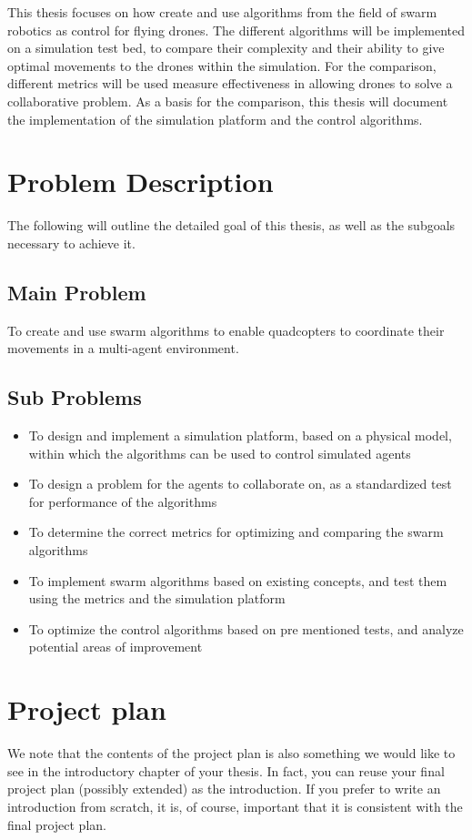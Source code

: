 This thesis focuses on how create and use algorithms from the field of swarm robotics as control for flying drones.
The different algorithms will be implemented on a simulation test bed, to compare their complexity and their ability to give optimal movements to the drones within the simulation. 
For the comparison, different metrics will be used measure effectiveness in allowing drones to solve a collaborative problem.
As a basis for the comparison, this thesis will document the implementation of the simulation platform and the control algorithms.

\section{Problem Description}
The following will outline the detailed goal of this thesis, as well as the subgoals necessary to achieve it. 

\subsection{Main Problem}
To create and use swarm algorithms to enable quadcopters to coordinate their movements in a multi-agent environment. 

\subsection{Sub Problems}
\label{intro:sub_problems}
\begin{itemize}
	\item{To design and implement a simulation platform, based on a physical model, within which the algorithms can be used to control simulated agents}
	\item{To design a problem for the agents to collaborate on, as a standardized test for performance of the algorithms}
	\item{To determine the correct metrics for optimizing and comparing the swarm algorithms}
	\item{To implement swarm algorithms based on existing concepts, and test them using the metrics and the simulation platform}
	\item{To optimize the control algorithms based on pre mentioned tests, and analyze potential areas of improvement}
\end{itemize}
 
\section{Project plan}
We note that the contents of the project plan is also something we would like to see in the introductory chapter of your thesis. In fact, you can reuse your final project plan (possibly extended) as the introduction. If you prefer to write an introduction from scratch, it is, of course, important that it is consistent with the final project plan.

